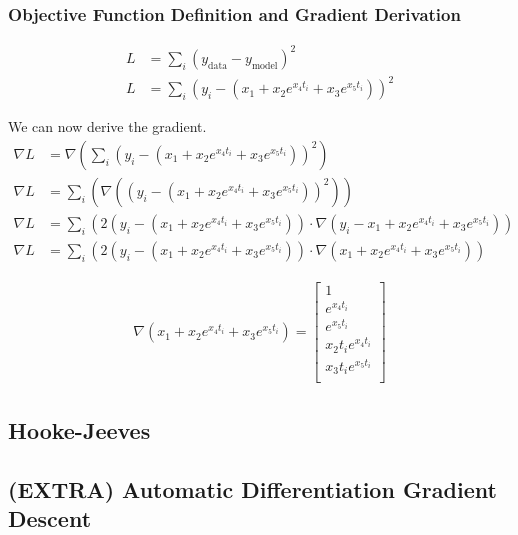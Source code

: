 \documentclass{article}
\begin{document}
    \subsubsection{Objective Function Definition and Gradient Derivation}

    \begin{align}
    L &= \sum_i (y_{\text{data}} - y_{\text{model}})^2 \\
    L &= \sum_i (y_{i} - (x_1 + x_2 e ^ {x_4 t_i} + x_3 e ^{x_5 t_i}))^2
    \end{align}

    We can now derive the gradient.
    \begin{align}
    \nabla L &= \nabla \left( \sum_i (y_{i} - (x_1 + x_2 e ^ {x_4 t_i} + x_3 e ^{x_5 t_i}))^2 \right) \\
    \nabla L &= \sum_i \left( \nabla \left( (y_{i} - (x_1 + x_2 e ^ {x_4 t_i} + x_3 e ^{x_5 t_i}))^2 \right) \right) \\
    \nabla L &= \sum_i \left( 2(y_{i} - (x_1 + x_2 e ^ {x_4 t_i} + x_3 e ^{x_5 t_i})) \cdot \nabla (y_{i} - x_1 + x_2 e ^ {x_4 t_i} + x_3 e ^{x_5 t_i}) \right) \\
    \nabla L &= \sum_i \left( 2(y_{i} - (x_1 + x_2 e ^ {x_4 t_i} + x_3 e ^{x_5 t_i})) \cdot \nabla (x_1 + x_2 e ^ {x_4 t_i} + x_3 e ^{x_5 t_i}) \right)
    \end{align}

    \begin{align}
        \nabla (x_1 + x_2 e ^ {x_4 t_i} + x_3 e ^{x_5 t_i}) = 
            \begin{bmatrix}
                1 \\
                e ^ {x_4 t_i} \\
                e ^ {x_5 t_i} \\
                x_2 t_i e ^ {x_4 t_i} \\
                x_3 t_i e ^{x_5 t_i} \\
            \end{bmatrix}
    \end{align}

    \subsection{Hooke-Jeeves}

    \subsection{(EXTRA) Automatic Differentiation Gradient Descent}
\end{document}
